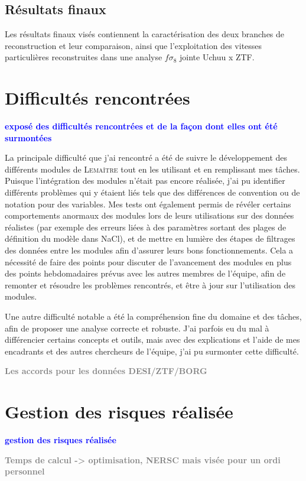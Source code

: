 \documentclass{book}
\newcommand{\todo}[1]{{\textcolor{gray}{\bf \large #1}}}
\newcommand{\consignes}[1]{{\textcolor{blue}{\bf \large #1}}}
\def\lemaitre{\textsc{Lemaître}\xspace}
\begin{document}
\subsection{Résultats finaux}

Les résultats finaux visés contiennent la caractérisation des deux branches de reconstruction et leur comparaison, ainsi que l'exploitation des vitesses particulières reconstruites dans une analyse $f\sigma_8$ jointe Uchuu x ZTF.

\section{Difficultés rencontrées}
\consignes{exposé des difficultés rencontrées et de la façon dont elles ont été surmontées}

La principale difficulté que j'ai rencontré a été de suivre le développement des différents modules de \lemaitre tout en les utilisant et en remplissant mes tâches. Puisque l'intégration des modules n'était pas encore réalisée, j'ai pu identifier différents problèmes qui y étaient liés tels que des différences de convention ou de notation pour des variables. Mes tests ont également permis de révéler certains comportements anormaux des modules lors de leurs utilisations sur des données réalistes (par exemple des erreurs liées à des paramètres sortant des plages de définition du modèle dans NaCl), et de mettre en lumière des étapes de filtrages des données entre les modules afin d'assurer leurs bons fonctionnements. Cela a nécessité de faire des points pour discuter de l'avancement des modules en plus des points hebdomadaires prévus avec les autres membres de l'équipe, afin de remonter et résoudre les problèmes rencontrés, et être à jour sur l'utilisation des modules.

Une autre difficulté notable a été la compréhension fine du domaine et des tâches, afin de proposer une analyse correcte et robuste. J'ai parfois eu du mal à différencier certains concepts et outils, mais avec des explications et l'aide de mes encadrants et des autres chercheurs de l'équipe, j'ai pu surmonter cette difficulté.


\todo{Les accords pour les données DESI/ZTF/BORG}


\section{Gestion des risques réalisée}
\consignes{gestion des risques réalisée}

\todo{Temps de calcul -> optimisation, NERSC mais visée pour un ordi personnel}
\end{document}
